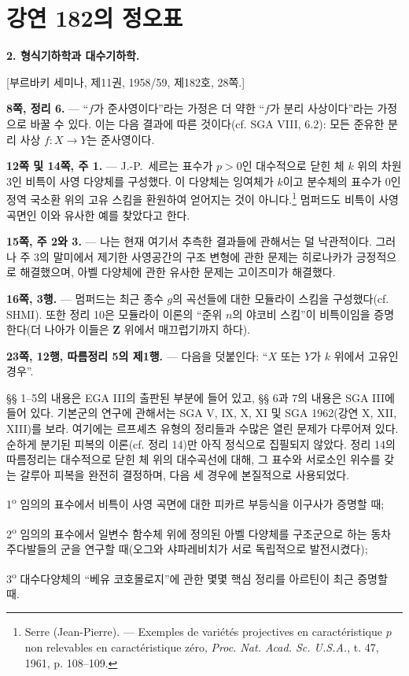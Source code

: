 \clearpage
\chapter*{강연 182의 정오표}
\setcounter{footnote}{1}

\noindent\textbf{2. 형식기하학과 대수기하학.}

\begin{center}
[부르바키 세미나, 제11권, 1958/59, 제182호, 28쪽.]
\end{center}

\noindent\textbf{8쪽, 정리 6.} --- ``$f$가 준사영이다''라는 가정은
더 약한 ``$f$가 분리 사상이다''라는 가정으로 바꿀 수 있다. 이는 다음
결과에 따른 것이다(cf. SGA VIII, 6.2): 모든 준유한 분리 사상
$f:X\longrightarrow Y$는 준사영이다.

\noindent\textbf{12쪽 및 14쪽, 주 1.} --- J.-P.~세르는 표수가 $p>0$인
대수적으로 닫힌 체 $k$ 위의 차원 3인 비특이 사영 다양체를 구성했다. 이
다양체는 잉여체가 $k$이고 분수체의 표수가 0인 정역 국소환 위의 고유 스킴을
환원하여 얻어지는 것이 아니다.\footnote{Serre (Jean-Pierre). --- Exemples de
variétés projectives en caractéristique $p$ non relevables en caractéristique
zéro, \emph{Proc. Nat. Acad. Sc. U.S.A.}, t. 47, 1961, p. 108--109.} 멈퍼드도
비특이 사영 곡면인 이와 유사한 예를 찾았다고 한다.

\noindent\textbf{15쪽, 주 2와 3.} --- 나는 현재 여기서 추측한 결과들에
관해서는 덜 낙관적이다. 그러나 주 3의 말미에서 제기한 사영공간의 구조
변형에 관한 문제는 히로나카가 긍정적으로 해결했으며, 아벨 다양체에 관한
유사한 문제는 고이즈미가 해결했다.

\noindent\textbf{16쪽, 3행.} --- 멈퍼드는 최근 종수 $g$의 곡선들에 대한
모듈라이 스킴을 구성했다(cf. SHMI). 또한 정리 10은 모듈라이 이론의
``준위 $n$의 야코비 스킴''이 비특이임을 증명한다(더 나아가 이들은
$\mathbf Z$ 위에서 매끄럽기까지 하다).

\noindent\textbf{23쪽, 12행, 따름정리 5의 제1행.} --- 다음을 덧붙인다:
``$X$ 또는 $Y$가 $k$ 위에서 고유인 경우''.

§§ 1--5의 내용은 EGA III의 출판된 부분에 들어 있고, §§ 6과 7의 내용은
SGA III에 들어 있다. 기본군의 연구에 관해서는 SGA V, IX, X, XI 및
SGA 1962(강연 X, XII, XIII)를 보라. 여기에는 르프셰츠 유형의 정리들과
수많은 열린 문제가 다루어져 있다. 순하게 분기된 피복의 이론(cf. 정리 14)만
아직 정식으로 집필되지 않았다. 정리 14의 따름정리는 대수적으로 닫힌 체
위의 대수곡선에 대해, 그 표수와 서로소인 위수를 갖는 갈루아 피복을 완전히
결정하며, 다음 세 경우에 본질적으로 사용되었다.

1\textsuperscript{o} 임의의 표수에서 비특이 사영 곡면에 대한 피카르
부등식을 이구사가 증명할 때;

2\textsuperscript{o} 임의의 표수에서 일변수 함수체 위에 정의된 아벨
다양체를 구조군으로 하는 동차 주다발들의 군을 연구할 때(오그와
샤파레비치가 서로 독립적으로 발전시켰다);

3\textsuperscript{o} 대수다양체의 ``베유 코호몰로지''에 관한 몇몇 핵심
정리를 아르틴이 최근 증명할 때.
